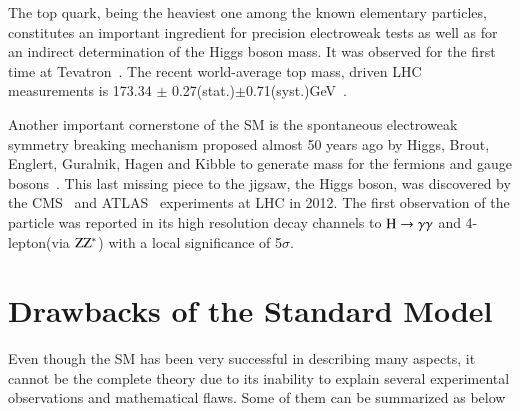 The top quark, being the heaviest one among the known elementary particles, constitutes an important ingredient for precision electroweak tests as well as for an indirect determination of the Higgs boson mass. It was observed for the first time at Tevatron~\cite{topquark}. The recent world-average top mass, driven  LHC measurements is 173.34 $\pm$ 0.27(stat.)$\pm$0.71(syst.)GeV~\cite{TopQuarkMass}.

Another important cornerstone of the SM is the spontaneous electroweak symmetry breaking mechanism proposed almost 50 years ago by Higgs, Brout, Englert,  Guralnik, Hagen and Kibble to generate mass for the  fermions and gauge bosons~\cite{higgs}. This last missing piece to the jigsaw, the Higgs boson, was discovered  by the  CMS~\cite{cms-higgs} and ATLAS~\cite{atlas-higgs} experiments at LHC in 2012. The first observation of the particle was reported in  its high resolution decay channels to $\rm H \rightarrow \gamma\gamma$ and 4-lepton(via $\rm ZZ^{*}$) with a local significance of 5$\sigma$. 



\section {Drawbacks of the Standard Model}

Even though the SM has been very successful in describing many aspects, it cannot be the complete theory due to its inability to explain several experimental observations and mathematical flaws. Some of them can be summarized as below

